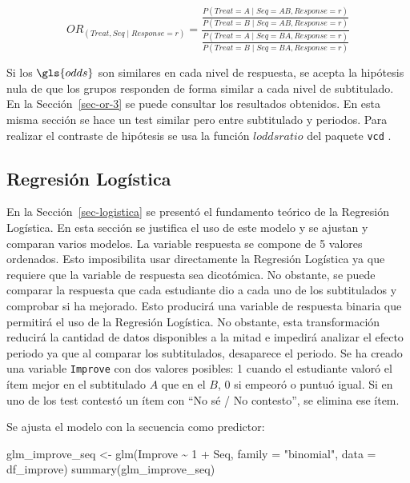 \documentclass[
  12pt,
  a4paper,
  extrafontsizes,
  onecolumn,
  openright,
  table]{memoir}
\newenvironment{Shaded}{\begin{snugshade}}{\end{snugshade}}
\newcommand{\AttributeTok}[1]{\textcolor[rgb]{0.40,0.45,0.13}{#1}}
\newcommand{\DecValTok}[1]{\textcolor[rgb]{0.68,0.00,0.00}{#1}}
\newcommand{\FunctionTok}[1]{\textcolor[rgb]{0.28,0.35,0.67}{#1}}
\newcommand{\NormalTok}[1]{\textcolor[rgb]{0.00,0.23,0.31}{#1}}
\newcommand{\OtherTok}[1]{\textcolor[rgb]{0.00,0.23,0.31}{#1}}
\newcommand{\SpecialCharTok}[1]{\textcolor[rgb]{0.37,0.37,0.37}{#1}}
\newcommand{\StringTok}[1]{\textcolor[rgb]{0.13,0.47,0.30}{#1}}
\begin{document}
\[
OR_{(Treat, Seq \mid Response=r)}=\frac{
    \frac{
            P(Treat=A \mid Seq=AB, Response=r)
        }{
            P(Treat=B \mid Seq=AB, Response=r)
        }
    }
    {\frac{
        P(Treat=A \mid Seq=BA, Response=r)
        }{
        P(Treat=B \mid Seq=BA, Response=r)
    }
}
\]

Si los \(\gls{odds}\) son similares en cada nivel de respuesta, se
acepta la hipótesis nula de que los grupos responden de forma similar a
cada nivel de subtitulado. En la Sección~\ref{sec-or-3} se puede
consultar los resultados obtenidos. En esta misma sección se hace un
test similar pero entre subtitulado y periodos. Para realizar el
contraste de hipótesis se usa la función \(loddsratio\) del paquete
\texttt{vcd} \autocite[ver][]{vcd}.

\hypertarget{sec-logistica-2}{%
\subsection{Regresión Logística}\label{sec-logistica-2}}

En la Sección~\ref{sec-logistica} se presentó el fundamento teórico de
la \gls{Regresión Logística}. En esta sección se justifica el uso de
este modelo y se ajustan y comparan varios modelos. La variable
respuesta se compone de 5 valores ordenados. Esto imposibilita usar
directamente la Regresión Logística ya que requiere que la variable de
respuesta sea dicotómica. No obstante, se puede comparar la respuesta
que cada estudiante dio a cada uno de los subtitulados y comprobar si ha
mejorado. Esto producirá una variable de respuesta binaria que permitirá
el uso de la Regresión Logística. No obstante, esta transformación
reducirá la cantidad de datos disponibles a la mitad e impedirá analizar
el \gls{efecto periodo} ya que al comparar los subtitulados, desaparece
el periodo. Se ha creado una variable \texttt{Improve} con dos valores
posibles: 1 cuando el estudiante valoró el ítem mejor en el subtitulado
\(A\) que en el \(B\), 0 si empeoró o puntuó igual. Si en uno de los
test contestó un ítem con \enquote{No sé / No contesto}, se elimina ese
ítem.

Se ajusta el modelo con la secuencia como predictor:

\scriptsize

\begin{Shaded}
\begin{Highlighting}[]
\NormalTok{glm\_improve\_seq }\OtherTok{\textless{}{-}} \FunctionTok{glm}\NormalTok{(Improve }\SpecialCharTok{\textasciitilde{}} \DecValTok{1} \SpecialCharTok{+}\NormalTok{ Seq, }\AttributeTok{family =} \StringTok{"binomial"}\NormalTok{, }\AttributeTok{data =}\NormalTok{ df\_improve)}
\FunctionTok{summary}\NormalTok{(glm\_improve\_seq)}
\end{Highlighting}
\end{Shaded}
\end{document}
